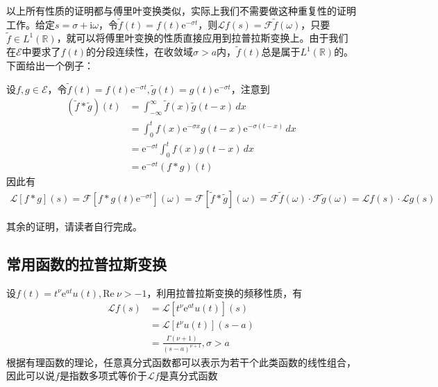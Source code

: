 以上所有性质的证明都与傅里叶变换类似，实际上我们不需要做这种重复性的证明工作。给定$s=\sigma+\mathrm{i}\omega$，令$\tilde{f}(t)=f(t)\mathrm{e}^{-\sigma t}$，则$\mathcal{L} f(s)=\mathcal{F} \tilde{f}(\omega)$，只要$\tilde{f}\in L^1(\mathbb{R} )$，就可以将傅里叶变换的性质直接应用到拉普拉斯变换上。由于我们在$\mathcal{E} $中要求了$f(t)$的分段连续性，在收敛域$\sigma>a$内，$\tilde{f}(t)$总是属于$L^1(\mathbb{R})$的。下面给出一个例子：
\begin{example}[卷积定理]
设$f,g\in\mathcal{E} $，令$\tilde{f}(t)=f(t)\mathrm{e}^{-\sigma t}, \tilde{g}(t)=g(t)\mathrm{e}^{-\sigma t}$，注意到\begin{align*}
    (\tilde{f}*\tilde{g})(t)&=\int_{-\infty}^{\infty}\tilde{f}(x)\tilde{g}(t-x)\,dx\\
    &=\int_0^{t}f(x)\mathrm{e}^{-\sigma x}g(t-x)\mathrm{e}^{-\sigma (t-x)}\,dx\\
    &=\mathrm{e}^{-\sigma t}\int_0^{t}f(x)g(t-x)\,dx\\
    &=\mathrm{e}^{-\sigma t}(f*g)(t)
\end{align*}
因此有
    \begin{align*}
        \mathcal{L} \left[f*g\right](s)=\mathcal{F} \left[f*g(t)\mathrm{e}^{-\sigma t}\right](\omega)=\mathcal{F} \left[\tilde{f}*\tilde{g}\right](\omega)=\mathcal{F} \tilde{f}(\omega)\cdot \mathcal{F} \tilde{g}(\omega)=\mathcal{L} f(s)\cdot \mathcal{L} g(s)
    \end{align*}
\end{example}
其余的证明，请读者自行完成。

\subsection{常用函数的拉普拉斯变换}\label{sub:ordinary_laplace}

\begin{example}[指数多项式]
    设$f(t)=t^\nu \mathrm{e}^{a t}u(t),\text{Re}\ \nu>-1$，利用拉普拉斯变换的频移性质，有
    \begin{align*}
        \mathcal{L} f(s)&=\mathcal{L}\left[t^\nu \mathrm{e}^{a t}u(t)\right](s)\\
        &=\mathcal{L} \left[t^\nu u(t)\right](s-a)\\
        &=\frac{\Gamma(\nu+1)}{(s-a)^{\nu+1}},\sigma>a
    \end{align*}
    根据有理函数的理论，任意真分式函数都可以表示为若干个此类函数的线性组合，因此可以说$f$是指数多项式等价于$\mathcal{L} f$是真分式函数
\end{example}

